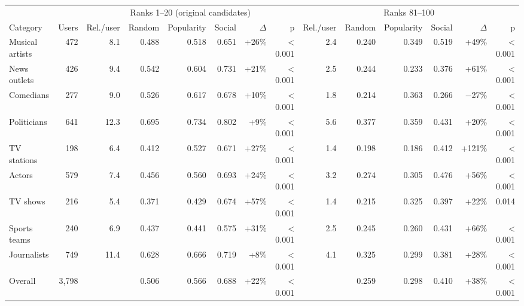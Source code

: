 \begin{tabular}{lrrrrrrrrrrrrr}
\toprule
 &  & \multicolumn{6}{c}{Ranks 1--20 (original candidates)} & \multicolumn{6}{c}{Ranks 81--100} \\
Category & Users & Rel./user & Random & Popularity & Social & $\Delta$ & p & Rel./user & Random & Popularity & Social & $\Delta$ & p \\
\midrule
Musical artists & 472 & 8.1 & 0.488 & 0.518 & 0.651 & +26\% & \textless{} 0.001 & 2.4 & 0.240 & 0.349 & 0.519 & +49\% & \textless{} 0.001 \\
News outlets & 426 & 9.4 & 0.542 & 0.604 & 0.731 & +21\% & \textless{} 0.001 & 2.5 & 0.244 & 0.233 & 0.376 & +61\% & \textless{} 0.001 \\
Comedians & 277 & 9.0 & 0.526 & 0.617 & 0.678 & +10\% & \textless{} 0.001 & 1.8 & 0.214 & 0.363 & 0.266 & $-$27\% & \textless{} 0.001 \\
Politicians & 641 & 12.3 & 0.695 & 0.734 & 0.802 & +9\% & \textless{} 0.001 & 5.6 & 0.377 & 0.359 & 0.431 & +20\% & \textless{} 0.001 \\
TV stations & 198 & 6.4 & 0.412 & 0.527 & 0.671 & +27\% & \textless{} 0.001 & 1.4 & 0.198 & 0.186 & 0.412 & +121\% & \textless{} 0.001 \\
Actors & 579 & 7.4 & 0.456 & 0.560 & 0.693 & +24\% & \textless{} 0.001 & 3.2 & 0.274 & 0.305 & 0.476 & +56\% & \textless{} 0.001 \\
TV shows & 216 & 5.4 & 0.371 & 0.429 & 0.674 & +57\% & \textless{} 0.001 & 1.4 & 0.215 & 0.325 & 0.397 & +22\% & 0.014 \\
Sports teams & 240 & 6.9 & 0.437 & 0.441 & 0.575 & +31\% & \textless{} 0.001 & 2.5 & 0.245 & 0.260 & 0.431 & +66\% & \textless{} 0.001 \\
Journalists & 749 & 11.4 & 0.628 & 0.666 & 0.719 & +8\% & \textless{} 0.001 & 4.1 & 0.325 & 0.299 & 0.381 & +28\% & \textless{} 0.001 \\
\midrule
Overall & 3,798 &  & 0.506 & 0.566 & 0.688 & +22\% & \textless{} 0.001 &  & 0.259 & 0.298 & 0.410 & +38\% & \textless{} 0.001 \\
\bottomrule
\end{tabular}

